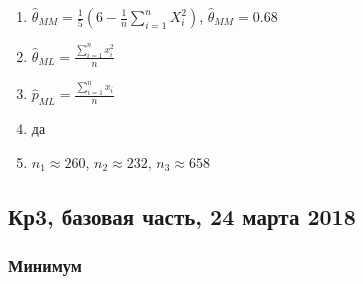 \begin{enumerate}
\item $\hat{\theta}_{MM} = \frac{1}{5}\left(6 - \frac{1}{n}\sum_{i=1}^n X_i^2 \right)$, $\hat{\theta}_{MM} = 0.68$
\item $\hat{\theta}_{ML} = \frac{\sum_{i=1}^n x_i^2}{n}$
\item $\hat{p}_{ML} = \frac{\sum_{i=1}^n x_i}{n}$
\item да
\item $n_1 \approx 260$, $n_2 \approx 232$, $n_3 \approx 658$

\end{enumerate}




\subsection{Кр3, базовая часть, 24 марта 2018}


	\subsubsection{Минимум}

